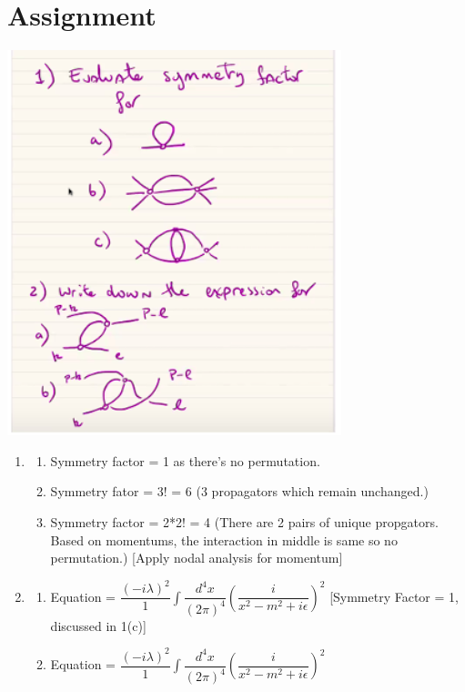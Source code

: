 \documentclass[a4paper]{article}
\begin{document}
\section{Assignment}
\includegraphics{assign}
\begin{enumerate}
    \item \begin{enumerate}
        \item Symmetry factor = 1 as there's no permutation.
        \item Symmetry fator = 3! = 6 (3 propagators which remain unchanged.)
        \item Symmetry factor = 2*2! = 4 (There are 2 pairs of unique propgators. Based on momentums, the interaction in middle is same so no permutation.) [Apply nodal analysis for momentum]
    \end{enumerate}
    \item \begin{enumerate}
        \item Equation = $\dfrac{(- i \lambda)^2}{1} \int\dfrac{d^4x}{(2 \pi)^4}(\dfrac{i}{x^2 - m^2 + i\epsilon})^2$ [Symmetry Factor = 1, discussed in 1(c)]
        \item Equation = $\dfrac{(- i \lambda)^2}{1}\int\dfrac{d^4x}{(2 \pi)^4}(\dfrac{i}{x^2 - m^2 + i\epsilon})^2$
    \end{enumerate}
\end{enumerate}
\end{document}
